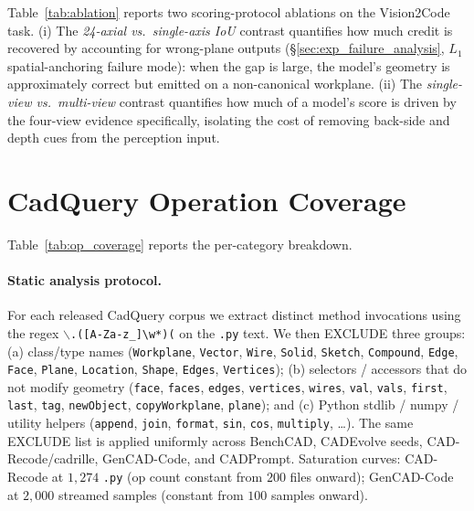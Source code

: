 

Table~\ref{tab:ablation} reports two scoring-protocol ablations on the Vision2Code task. (i) The \emph{24-axial vs.\ single-axis IoU} contrast quantifies how much credit is recovered by accounting for wrong-plane outputs (\S\ref{sec:exp_failure_analysis}, $L_1$ spatial-anchoring failure mode): when the gap is large, the model's geometry is approximately correct but emitted on a non-canonical workplane. (ii) The \emph{single-view vs.\ multi-view} contrast quantifies how much of a model's score is driven by the four-view evidence specifically, isolating the cost of removing back-side and depth cues from the perception input.

\section{CadQuery Operation Coverage}
\label{app:ops}

Table~\ref{tab:op_coverage} reports the per-category breakdown.

\paragraph{Static analysis protocol.}
For each released CadQuery corpus we extract distinct method invocations using the regex \texttt{$\backslash$.([A-Za-z\_]\textbackslash w*)(} on the \texttt{.py} text. We then EXCLUDE three groups: (a) class/type names (\texttt{Workplane}, \texttt{Vector}, \texttt{Wire}, \texttt{Solid}, \texttt{Sketch}, \texttt{Compound}, \texttt{Edge}, \texttt{Face}, \texttt{Plane}, \texttt{Location}, \texttt{Shape}, \texttt{Edges}, \texttt{Vertices}); (b) selectors / accessors that do not modify geometry (\texttt{face}, \texttt{faces}, \texttt{edges}, \texttt{vertices}, \texttt{wires}, \texttt{val}, \texttt{vals}, \texttt{first}, \texttt{last}, \texttt{tag}, \texttt{newObject}, \texttt{copyWorkplane}, \texttt{plane}); and (c) Python stdlib / numpy / utility helpers (\texttt{append}, \texttt{join}, \texttt{format}, \texttt{sin}, \texttt{cos}, \texttt{multiply}, \ldots). The same EXCLUDE list is applied uniformly across BenchCAD, CADEvolve seeds, CAD-Recode/cadrille, GenCAD-Code, and CADPrompt. Saturation curves: CAD-Recode at $1{,}274$ \texttt{.py} (op count constant from $200$ files onward); GenCAD-Code at $2{,}000$ streamed samples (constant from $100$ samples onward).

